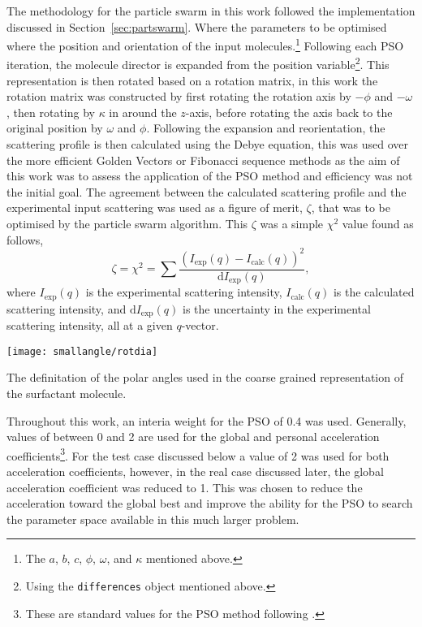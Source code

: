 The methodology for the particle swarm in this work followed the implementation discussed in Section~\ref{sec:partswarm}.
Where the parameters to be optimised where the position and orientation of the input molecules.\footnote{The $a$, $b$, $c$, $\phi$, $\omega$, and $\kappa$ mentioned above.}
Following each PSO iteration, the molecule director is expanded from the position variable\footnote{Using the \texttt{differences} object mentioned above.}.
This representation is then rotated based on a rotation matrix, in this work the rotation matrix was constructed by first rotating the rotation axis by $-\phi$ and $-\omega$, then rotating by $\kappa$ in around the $z$-axis, before rotating the axis back to the original position by $\omega$ and $\phi$.
Following the expansion and reorientation, the scattering profile is then calculated using the Debye equation,\autocite{debye_zerstreuung_1915} this was used over the more efficient Golden Vectors\autocite{watson_rapid_2013} or Fibonacci sequence\autocite{svergun_solution_1994} methods as the aim of this work was to assess the application of the PSO method and efficiency was not the initial goal.
The agreement between the calculated scattering profile and the experimental input scattering was used as a figure of merit, $\zeta$, that was to be optimised by the particle swarm algorithm.
This $\zeta$ was a simple $\chi^2$ value found as follows,
%
\begin{equation}
\zeta = \chi^2 = \sum\frac{(I_{\text{exp}}(q) - I_{\text{calc}}(q))^2}{\text{d}I_{\text{exp}}(q)},
\end{equation}
%
where $I_{\text{exp}}(q)$ is the experimental scattering intensity, $I_{\text{calc}}(q)$ is the calculated scattering intensity, and $\text{d}I_{\text{exp}}(q)$ is the uncertainty in the experimental scattering intensity, all at a given $q$-vector.
%
\begin{marginfigure}
    \centering
\texttt{[image: smallangle/rotdia]}
    \caption{The definitation of the polar angles used in the coarse grained representation of the surfactant molecule.}
    \label{fig:rot}
\end{marginfigure}
%

Throughout this work, an interia weight for the PSO of 0.4 was used.
Generally, values of between 0 and 2 are used for the global and personal acceleration coefficients\footnote{These are standard values for the PSO method following \cite{sun_study_2010}.}.
For the test case discussed below a value of 2 was used for both acceleration coefficients, however, in the real case discussed later, the global acceleration coefficient was reduced to 1.
This was chosen to reduce the acceleration toward the global best and improve the ability for the PSO to search the parameter space available in this much larger problem.

